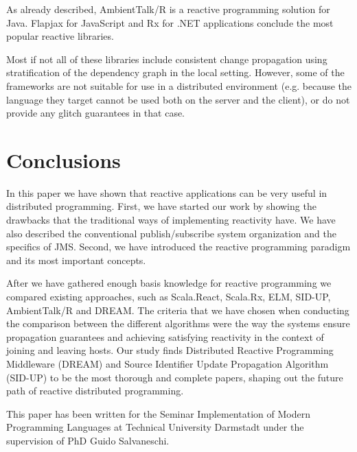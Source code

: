 \documentclass{sigplanconf}
\begin{document}
As already described, AmbientTalk/R is a reactive programming solution for Java. Flapjax \cite{javascript} for JavaScript and Rx \cite{netrx} for .NET applications conclude the most popular reactive libraries.

Most if not all of these libraries include consistent change propagation using  stratification of the dependency graph in the local setting. However, some of the frameworks are not suitable for use in a distributed environment (e.g. because the language they target cannot be used both on the server and the client), or do not provide any glitch guarantees in that case. 

\section{Conclusions}
In this paper we have shown that reactive applications can be very useful in distributed programming. First, we have started our work by showing the drawbacks that the traditional ways of implementing reactivity have. We have also described the conventional publish/subscribe system organization and the specifics of JMS. Second, we have introduced the reactive programming paradigm and its most important concepts.

After we have gathered enough basis knowledge for reactive programming we compared existing approaches, such as Scala.React, Scala.Rx, ELM, SID-UP, AmbientTalk/R and DREAM. The criteria that we have chosen when conducting the comparison between the different algorithms were the way the systems ensure propagation guarantees and achieving satisfying reactivity in the context of joining and leaving hosts. Our study finds Distributed Reactive Programming Middleware (DREAM) and Source Identifier Update Propagation Algorithm (SID-UP) to be the most thorough and complete papers, shaping out the future path of reactive distributed programming.



\acks

This paper has been written for the Seminar Implementation of Modern Programming Languages at Technical University Darmstadt under the supervision of PhD Guido Salvaneschi.

\end{document}
